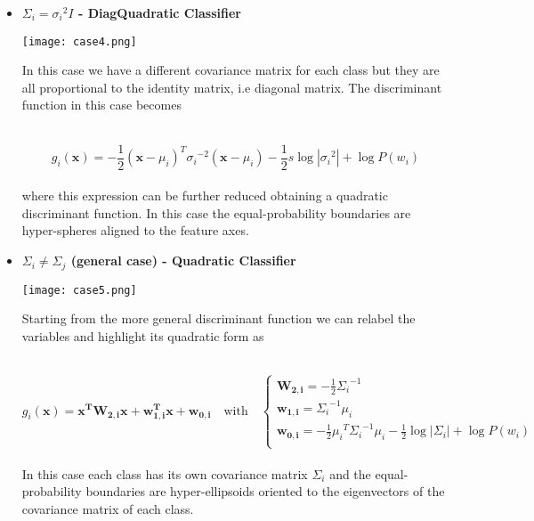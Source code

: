 \documentclass{standalone}
\begin{document}
\begin{itemize}
\item \textbf{$\Sigma_i = {\sigma_i}^2I$ - DiagQuadratic Classifier}

\begin{minipage}{.30\textwidth}
\hspace{-.5cm}
\texttt{[image: case4.png]}
\end{minipage}%
\begin{minipage}{.70\textwidth}
In this case we have a different covariance matrix for each class but they are all proportional to the identity matrix, i.e diagonal matrix.
The discriminant function in this case becomes
\end{minipage}\\

\begin{equation}
g_i(\mathbf{x}) = -\frac{1}{2}(\mathbf{x}-\mu_i)^T{\sigma_i}^{-2}(\mathbf{x}-\mu_i) -\frac{1}{2}s\log\left|{\sigma_i}^2\right|+\log P(w_i)
\end{equation}
\\
where this expression can be further reduced obtaining a quadratic discriminant function.
In this case the equal-probability boundaries are hyper-spheres aligned to the feature axes.

\item \textbf{$\Sigma_i \neq\Sigma_j$ (general case) - Quadratic Classifier}

\begin{minipage}{.30\textwidth}
\hspace{-.5cm}
\texttt{[image: case5.png]}
\end{minipage}%
\begin{minipage}{.70\textwidth}
Starting from the more general discriminant function we can relabel the variables and highlight its quadratic form as
\end{minipage}\\

\begin{equation}
g_i(\mathbf{x}) = \mathbf{x^TW_{2,i}x}+\mathbf{w_{1,i}^Tx} + \mathbf{w_{0,i}} \quad \mbox{with}\quad \left\{\begin{array}{l} \mathbf{W_{2,i}}=-\frac{1}{2}{\Sigma_i}^{-1}\\ \mathbf{w_{1,i}}={\Sigma_i}^{-1}\mu_i \\ \mathbf{w_{0,i}}=-\frac{1}{2}{\mu_i}^T{\Sigma_i}^{-1}\mu_i-\frac{1}{2}\log\left|\Sigma_i\right|+\log P(w_i) \\ \end{array}\right.
\end{equation}
\\
In this case each class has its own covariance matrix $\Sigma_i$ and the equal-probability boundaries are hyper-ellipsoids oriented to the eigenvectors of the covariance matrix of each class.

\end{itemize}
\end{document}
